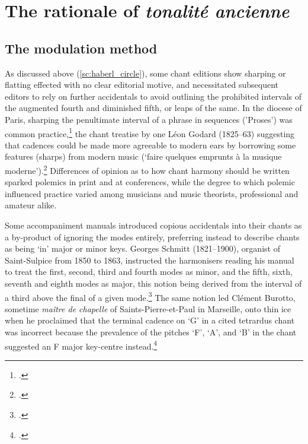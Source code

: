 \section{The rationale of \emph{tonalité ancienne}}
\subsection{The modulation method}
\label{sc:modulation}%
As discussed above (\cref{sc:haberl_circle}), some chant editions show sharping or flatting effected with no clear editorial motive, and necessitated subsequent editors to rely on further accidentals to avoid outlining the prohibited intervals of the augmented fourth and diminished fifth, or leaps of the same.
In the diocese of Paris, sharping the penultimate interval of a phrase in sequences ('Proses') was common practice,\footcite[39]{G.Nouvellemethodeplainchant1829} the chant treatise by one Léon Godard (1825--63) suggesting that cadences could be made more agreeable to modern ears by borrowing some features (sharps) from modern music (`faire quelques emprunts à la musique moderne').\footcite[18]{GodardTraiteelementaireharmonie1851}
Differences of opinion as to how chant harmony should be written sparked polemics in print and at conferences, while the degree to which polemic influenced practice varied among musicians and music theorists, professional and amateur alike.

Some accompaniment manuals introduced copious accidentals into their chants as a by-product of ignoring the modes entirely, preferring instead to describe chants as being `in' major or minor keys.
Georges Schmitt (1821--1900), organist of Saint-Sulpice from 1850 to 1863, instructed the harmonisers reading his manual to treat the first, second, third and fourth modes as minor, and the fifth, sixth, seventh and eighth modes as major, this notion being derived from the interval of a third above the final of a given mode.\footcite[23]{SchmittMethodeelementaireharmonisation1857}
%
The same notion led Clément Burotto, sometime \emph{maître de chapelle} of Saints-Pierre-et-Paul in Marseille, onto thin ice when he proclaimed that the terminal cadence on `G' in a cited tetrardus chant was incorrect because the prevalence of the pitches `F', `A', and `B'\flat{} in the chant suggested an F major key-centre instead.\footcite[22]{Burottorestaurationplainchantson1869}

